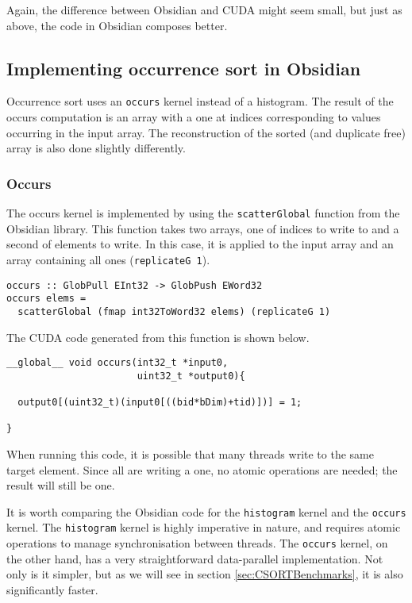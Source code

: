 Again, the difference between Obsidian and CUDA might seem small, but
just as above, the code in Obsidian composes better.

\subsection{Implementing occurrence sort in Obsidian} 
\label{sec:occur}

Occurrence sort uses an {\tt occurs} kernel instead of a 
histogram. The result of the occurs computation is an array with a one 
at indices corresponding to values occurring in the input array. The 
reconstruction of the sorted (and duplicate free) array is also done 
slightly differently.

\subsubsection{Occurs}

The occurs kernel is implemented by using the {\tt scatterGlobal} 
function from the Obsidian library. This function takes two arrays, one of 
indices to write to and a second of elements to write. In this case, it 
is applied to the input array and an array containing all ones 
({\tt replicateG 1}). 

\begin{small}
\begin{Verbatim}[samepage=true] 
occurs :: GlobPull EInt32 -> GlobPush EWord32
occurs elems = 
  scatterGlobal (fmap int32ToWord32 elems) (replicateG 1)
\end{Verbatim}
\end{small} 

The CUDA code generated from this function is shown below. 

\begin{small}
\begin{Verbatim}[samepage=true] 
__global__ void occurs(int32_t *input0,
                       uint32_t *output0){
   
  output0[(uint32_t)(input0[((bid*bDim)+tid)])] = 1;
  
}
\end{Verbatim} 
\end{small} 

When running this code, it is possible that many threads write to the same 
target element. Since all are writing a one, no atomic operations are needed; 
the result will still be one. 

It is worth comparing the Obsidian code for the {\tt histogram} kernel
and the {\tt occurs} kernel. The {\tt histogram} kernel is highly
imperative in nature, and requires atomic operations to manage
synchronisation between threads. The {\tt occurs} kernel, on the other
hand, has a very straightforward data-parallel implementation. Not only
is it simpler, but as we will see in section \ref{sec:CSORTBenchmarks}, it
is also significantly faster.

